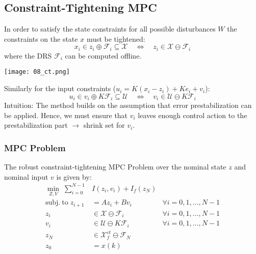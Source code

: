 \subsection{Constraint-Tightening MPC}

In order to satisfy the state constraints for all possible disturbances $W$ the constraints on the state $x$ must be tightened:
\begin{equation*}
    x_i \in z_i \oplus \mathcal{F}_i \subseteq \mathcal{X} \quad \Leftrightarrow \quad z_i \in \mathcal{X}\ominus \mathcal{F}_i
\end{equation*}
where the DRS $\mathcal{F}_i$ can be computed offline.

\begin{center}
    \texttt{[image: 08\_ct.png]}
\end{center}

\newpar{}
Similarly for the input constraints ($u_i = K(x_i - z_i) + K e_i + v_i$): %
\begin{equation*}
    u_i \in v_i \oplus K \mathcal{F}_i \subseteq \mathcal{U}\quad \Leftrightarrow \quad v_i \in \mathcal{U} \ominus K\mathcal{F}_i
\end{equation*}
Intuition: The method builds on the assumption that error prestabilization can be applied. Hence, we must ensure that $v_i$ leaves enough control action to the prestabilization part $\rightarrow$ shrink set for $v_i$.

\subsubsection{MPC Problem}
The robust constraint-tightening MPC Problem over the nominal state $z$ and nominal input $v$ is given by:
\begin{align*}
    \min_{Z,V}\;         \sum_{i=0}^{N-1}                                                               & I(z_{i},v_{i})+I_{f}(z_{N})                                                \\
    \mathrm{subj.~to}\;                                                                         z_{i+1} & =Az_{i}+Bv_{i}                               & \forall i=0, 1, \ldots, N-1 \\
    z_{i}                                                                                               & \in\mathcal{X}\ominus\mathcal{F}_{i}         & \forall i=0, 1, \ldots, N-1 \\
    v_i                                                                                                 & \in\mathcal{U}\ominus K\mathcal{F}_i         & \forall i=0, 1, \ldots, N-1 \\
    z_{N}                                                                                               & \in\mathcal{X}_{f}^{ct}\ominus \mathcal{F}_N                               \\
    z_0                                                                                                 & =x(k)
\end{align*}



